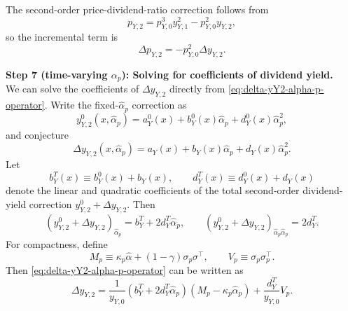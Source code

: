 The second-order price-dividend-ratio correction follows from
\begin{equation}
    p_{Y,2}=p_{Y,0}^3y_{Y,1}^2-p_{Y,0}^2y_{Y,2},
\end{equation}
so the incremental term is
\begin{equation}
    \Delta p_{Y,2}=-p_{Y,0}^2\Delta y_{Y,2}.
\end{equation}


\noindent\textbf{Step 7 (time-varying $\alpha_p$): Solving for coefficients of dividend yield.}\\
We can solve the coefficients of $\Delta y_{Y,2}$ directly from \eqref{eq:delta-yY2-alpha-p-operator}.
Write the fixed-$\hat{\alpha}_p$ correction as
\begin{equation}
    y_{Y,2}^{0}(x,\hat{\alpha}_p)
    =a_Y^{0}(x)+b_Y^{0}(x)\hat{\alpha}_p+d_Y^{0}(x)\hat{\alpha}_p^2,
\end{equation}
and conjecture
\begin{equation}
    \Delta y_{Y,2}(x,\hat{\alpha}_p)
    =a_Y(x)+b_Y(x)\hat{\alpha}_p+d_Y(x)\hat{\alpha}_p^2.
\end{equation}
Let
\begin{equation}
    b_Y^T(x)\equiv b_Y^{0}(x)+b_Y(x),
    \qquad
    d_Y^T(x)\equiv d_Y^{0}(x)+d_Y(x)
\end{equation}
denote the linear and quadratic coefficients of the total second-order dividend-yield correction $y_{Y,2}^{0}+\Delta y_{Y,2}$.
Then
\begin{equation}
    (y_{Y,2}^{0}+\Delta y_{Y,2})_{\hat{\alpha}_p}
    =b_Y^T+2d_Y^T\hat{\alpha}_p,
    \qquad
    (y_{Y,2}^{0}+\Delta y_{Y,2})_{\hat{\alpha}_p\hat{\alpha}_p}
    =2d_Y^T.
\end{equation}
For compactness, define
\begin{equation}
    M_p\equiv \kappa_p\hat{\alpha}+(1-\gamma)\sigma_p\sigma^\top,
    \qquad
    V_p\equiv \sigma_p\sigma_p^\top.
\end{equation}
Then \eqref{eq:delta-yY2-alpha-p-operator} can be written as
\begin{equation}\label{eq:delta-yY2-alpha-p-coeff-operator}
    \Delta y_{Y,2}
    =\frac{1}{y_{Y,0}}(b_Y^T+2d_Y^T\hat{\alpha}_p)
    \left(M_p-\kappa_p\hat{\alpha}_p\right)
    +\frac{d_Y^T}{y_{Y,0}}V_p.
\end{equation}


